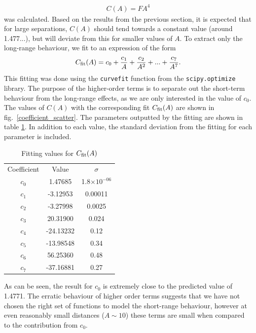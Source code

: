 \documentclass[11pt, oneside]{article}  	%
\numberwithin{equation}{section}
\begin{document}
\begin{align}\label{force_coeff}
    C(A) = FA^4
\end{align}
was calculated. Based on the results from the previous section, it is expected that for large separations, $C(A)$ should tend towards a constant value (around 1.477...), but will deviate from this for smaller values of $A$. To extract only the long-range behaviour, we fit to an expression of the form
\begin{align}\label{eqn:fitting_curve}
C_{\textup{fit}}(A) = c_0 + \frac{c_1}{A} + \frac{c_2}{A^2} + ... + \frac{c_7}{A^7}.
\end{align}
This fitting was done using the \texttt{curve\textunderscore fit} function from the \texttt{scipy.optimize} library. The purpose of the higher-order terms is to separate out the short-term behaviour from the long-range effects, as we are only interested in the value of $c_0$. The values of $C(A)$ with the corresponding fit $C_{\textup{fit}}(A)$ are shown in fig.~\ref{coefficient_scatter}. The parameters outputted by the fitting are shown in table \ref{kak_manton_table}. In addition to each value, the standard deviation from the fitting for each parameter is included. \par
\begin{table}[ht]
    \begin{center}
    \caption{Fitting values for $C_{\textup{fit}}(A)$}
        \begin{tabular}{|c|c|c|}\label{kak_manton_table}
        Coefficient & Value & $\sigma$\\
         $c_ 0 $ &  1.47685  &  1.8$\times 10^{-06}$ \\
        $c_ 1 $ &  -3.12953  &  0.00011 \\
        $c_ 2 $ &  -3.27998  &  0.0025 \\
        $c_ 3 $ &  20.31900  &  0.024 \\
        $c_ 4 $ &  -24.13232  &  0.12 \\
        $c_ 5 $ &  -13.98548  &  0.34 \\
        $c_ 6 $ &  56.25360  &  0.48 \\
        $c_ 7 $ &  -37.16881  &  0.27 \\
        \end{tabular}
    \end{center}
\end{table}
As can be seen, the result for $c_0$ is extremely close to the predicted value of 1.4771. The erratic behaviour of higher order terms suggests that we have not chosen the right set of functions to model the short-range behaviour, however at even reasonably small distances ($A\sim 10$) these terms are small when compared to the contribution from $c_0$.
\end{document}
